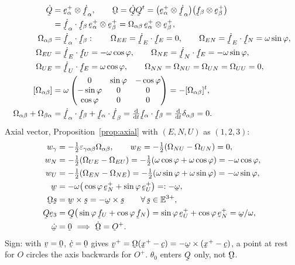 \begin{solution}
\begin{align*}
   \dot\bQ&=\be^{+}_{\alpha}\otimes\dot\bff_{\alpha},\qquad
   \bOm=\dot\bQ\bQ^{t}
   =\big(\be^{+}_{\alpha}\otimes\dot\bff_{\alpha}\big)
    \big(\bff_{\beta}\otimes\be^{+}_{\beta}\big)\\
   &=\ip{\dot\bff_{\alpha}}{\bff_{\beta}}\,
     \be^{+}_{\alpha}\otimes\be^{+}_{\beta}
   =\Omega_{\alpha\beta}\,\be^{+}_{\alpha}\otimes\be^{+}_{\beta},\\
   \Omega_{\alpha\beta}&=\ip{\dot\bff_{\alpha}}{\bff_{\beta}}:
   \qquad
   \Omega_{EE}=\ip{\dot\bff_{E}}{\bff_{E}}=0,\qquad
   \Omega_{EN}=\ip{\dot\bff_{E}}{\bff_{N}}=\omega\sin\varphi,\\
   \Omega_{EU}&=\ip{\dot\bff_{E}}{\bff_{U}}=-\omega\cos\varphi,\qquad
   \Omega_{NE}=\ip{\dot\bff_{N}}{\bff_{E}}=-\omega\sin\varphi,\\
   \Omega_{UE}&=\ip{\dot\bff_{U}}{\bff_{E}}=\omega\cos\varphi,\qquad
   \Omega_{NN}=\Omega_{NU}=\Omega_{UN}=\Omega_{UU}=0,\\
   [\Omega_{\alpha\beta}]&=\omega
   \begin{pmatrix}
      0 & \sin\varphi & -\cos\varphi\\
      -\sin\varphi & 0 & 0\\
      \cos\varphi & 0 & 0
   \end{pmatrix}
   =-[\Omega_{\alpha\beta}]^{t},\\
   \Omega_{\alpha\beta}+\Omega_{\beta\alpha}
   &=\ip{\dot\bff_{\alpha}}{\bff_{\beta}}
    +\ip{\bff_{\alpha}}{\dot\bff_{\beta}}
   =\tfrac{\dl}{\dl t}\ip{\bff_{\alpha}}{\bff_{\beta}}
   =\tfrac{\dl}{\dl t}\dd_{\alpha\beta}=0 .
\end{align*}
Axial vector, Proposition~\ref{prop:axial} with $(E,N,U)$ as $(1,2,3)$:
\begin{align*}
   w_{\gamma}&=-\tfrac12\eps_{\gamma\alpha\beta}\Omega_{\alpha\beta},\qquad
   w_{E}=-\tfrac12(\Omega_{NU}-\Omega_{UN})=0,\\
   w_{N}&=-\tfrac12(\Omega_{UE}-\Omega_{EU})
        =-\tfrac12(\omega\cos\varphi+\omega\cos\varphi)=-\omega\cos\varphi,\\
   w_{U}&=-\tfrac12(\Omega_{EN}-\Omega_{NE})
        =-\tfrac12(\omega\sin\varphi+\omega\sin\varphi)=-\omega\sin\varphi,\\
   \bw&=-\omega\big(\cos\varphi\,\be^{+}_{N}+\sin\varphi\,\be^{+}_{U}\big)
      =:-\bom,\\
   \bOm\bs&=\bw\times\bs=-\bom\times\bs
      \qquad\forall\,\bs\in\mathbb{E}^{3+},\\
   \bQ\be_{3}&=\bQ\big(\sin\varphi\,\bff_{U}+\cos\varphi\,\bff_{N}\big)
      =\sin\varphi\,\be^{+}_{U}+\cos\varphi\,\be^{+}_{N}
      =\bom/\omega,\\
   \dot\bom&=\bze\ \Longrightarrow\ \dot\bOm=\Ob^{+}.
\end{align*}
Sign:  with $\bv=\bze$, $\dot\bc=\bze$ gives
$\bv^{+}=\bOm(\bx^{+}-\bc)=-\bom\times(\bx^{+}-\bc)$, a point at rest for
$O$ circles the axis backwards for $O^{+}$. $\theta_{0}$ enters $\bQ$
only, not $\bOm$.


\end{solution}
